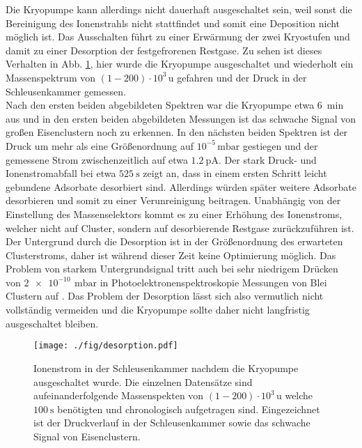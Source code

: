 Die Kryopumpe kann allerdings nicht dauerhaft ausgeschaltet sein, weil sonst die Bereinigung des Ionenstrahls nicht stattfindet und somit eine Deposition nicht möglich ist.
Das Ausschalten führt zu einer Erwärmung der zwei Kryostufen und damit zu einer Desorption der festgefrorenen Restgase.
Zu sehen ist dieses Verhalten in Abb. \ref{fig:desorp}, hier wurde die Kryopumpe ausgeschaltet und wiederholt ein Massenspektrum von $(1-200)\cdot 10^3\,\text{u}$ gefahren und der Druck in der Schleusenkammer gemessen.\\
Nach den ersten beiden abgebildeten Spektren war die Kryopumpe etwa $\SI{6}{\min}$ aus und in den ersten beiden abgebildeten Messungen ist das schwache Signal von großen Eisenclustern noch zu erkennen.
In den nächsten beiden Spektren ist der Druck um mehr als eine Größenordnung auf $10^{-5}\,\text{mbar}$ gestiegen und der gemessene Strom zwischenzeitlich auf etwa $\SI{1.2}{\pA}$.
Der stark Druck- und Ionenstromabfall bei etwa $\SI{525}{\second}$ zeigt an, dass in einem ersten Schritt leicht gebundene Adsorbate desorbiert sind.
Allerdings würden später weitere Adsorbate desorbieren und somit zu einer Verunreinigung beitragen. 
Unabhängig von der Einstellung des Massenselektors kommt es zu einer Erhöhung des Ionenstroms, welcher nicht auf Cluster, sondern auf desorbierende Restgase zurückzuführen ist.
Der Untergrund durch die Desorption ist in der Größenordnung des erwarteten Clusterstroms, daher ist während dieser Zeit keine Optimierung möglich.
Das Problem von starkem Untergrundsignal tritt auch bei sehr niedrigem Drücken von $\SI{2e-10}{}\,\text{mbar}$ in Photoelektronenspektroskopie Messungen von Blei Clustern auf \cite{Senz.2009}. 
Das Problem der Desorption lässt sich also vermutlich nicht vollständig vermeiden und die Kryopumpe sollte daher nicht langfristig ausgeschaltet bleiben.
\begin{figure}
  \centering
  \texttt{[image: ./fig/desorption.pdf]}
  \caption{Ionenstrom in der Schleusenkammer nachdem die Kryopumpe ausgeschaltet wurde. Die einzelnen Datensätze sind aufeinanderfolgende Massenspekten von $(1-200)\cdot 10^3\,\text{u}$ welche $\SI{100}{\second}$ benötigten und chronologisch aufgetragen sind. Eingezeichnet ist der Druckverlauf in der Schleusenkammer sowie das schwache Signal von Eisenclustern.}
  \label{fig:desorp}
\end{figure}

